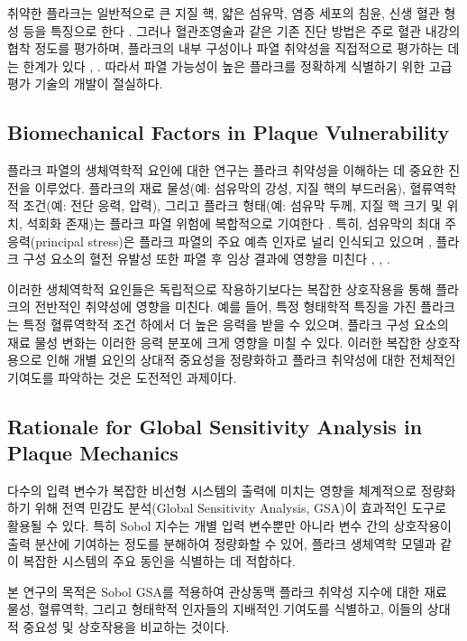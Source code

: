 \documentclass[preprint,12pt]{elsarticle}
\begin{document}
취약한 플라크는 일반적으로 큰 지질 핵, 얇은 섬유막, 염증 세포의 침윤, 신생 혈관 형성 등을 특징으로 한다 \cite{naghavi2003}. 그러나 혈관조영술과 같은 기존 진단 방법은 주로 혈관 내강의 협착 정도를 평가하며, 플라크의 내부 구성이나 파열 취약성을 직접적으로 평가하는 데는 한계가 있다 \cite{burke1997}, \cite{motoyama2009}. 따라서 파열 가능성이 높은 플라크를 정확하게 식별하기 위한 고급 평가 기술의 개발이 절실하다.

\subsection{Biomechanical Factors in Plaque Vulnerability}
플라크 파열의 생체역학적 요인에 대한 연구는 플라크 취약성을 이해하는 데 중요한 진전을 이루었다. 플라크의 재료 물성(예: 섬유막의 강성, 지질 핵의 부드러움), 혈류역학적 조건(예: 전단 응력, 압력), 그리고 플라크 형태(예: 섬유막 두께, 지질 핵 크기 및 위치, 석회화 존재)는 플라크 파열 위험에 복합적으로 기여한다 \cite{virmani2005}. 특히, 섬유막의 최대 주응력(principal stress)은 플라크 파열의 주요 예측 인자로 널리 인식되고 있으며 \cite{cheng1993}, 플라크 구성 요소의 혈전 유발성 또한 파열 후 임상 결과에 영향을 미친다 \cite{fernndezortz1994}, \cite{shah2003}, \cite{wal1999}.

이러한 생체역학적 요인들은 독립적으로 작용하기보다는 복잡한 상호작용을 통해 플라크의 전반적인 취약성에 영향을 미친다. 예를 들어, 특정 형태학적 특징을 가진 플라크는 특정 혈류역학적 조건 하에서 더 높은 응력을 받을 수 있으며, 플라크 구성 요소의 재료 물성 변화는 이러한 응력 분포에 크게 영향을 미칠 수 있다. 이러한 복잡한 상호작용으로 인해 개별 요인의 상대적 중요성을 정량화하고 플라크 취약성에 대한 전체적인 기여도를 파악하는 것은 도전적인 과제이다.

\subsection{Rationale for Global Sensitivity Analysis in Plaque Mechanics}
다수의 입력 변수가 복잡한 비선형 시스템의 출력에 미치는 영향을 체계적으로 정량화하기 위해 전역 민감도 분석(Global Sensitivity Analysis, GSA)이 효과적인 도구로 활용될 수 있다. 특히 Sobol 지수는 개별 입력 변수뿐만 아니라 변수 간의 상호작용이 출력 분산에 기여하는 정도를 분해하여 정량화할 수 있어, 플라크 생체역학 모델과 같이 복잡한 시스템의 주요 동인을 식별하는 데 적합하다.

본 연구의 목적은 Sobol GSA를 적용하여 관상동맥 플라크 취약성 지수에 대한 재료 물성, 혈류역학, 그리고 형태학적 인자들의 지배적인 기여도를 식별하고, 이들의 상대적 중요성 및 상호작용을 비교하는 것이다.
\end{document}
